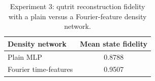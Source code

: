 \begin{table}[ht]
\centering
\caption{Experiment 3: qutrit reconstruction fidelity with a plain versus a Fourier-feature density network.}
\label{tab:exp3}
\begin{tabular}{lc}
\hline
Density network & Mean state fidelity \\
\hline
Plain MLP & 0.8788 \\
Fourier time-features & 0.9507 \\
\hline
\end{tabular}
\end{table}
